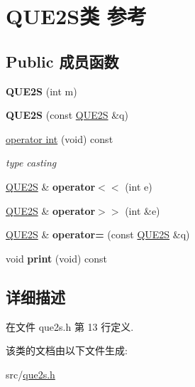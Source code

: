 \hypertarget{classQUE2S}{}\section{Q\+U\+E2\+S类 参考}
\label{classQUE2S}
\subsection*{Public 成员函数}
\begin{DoxyCompactItemize}
\item 
{\bfseries Q\+U\+E2S} (int m)\hypertarget{classQUE2S_a1c32e8ef08e7c8ea6249a6318dcae8c0}{}\label{classQUE2S_a1c32e8ef08e7c8ea6249a6318dcae8c0}

\item 
{\bfseries Q\+U\+E2S} (const \hyperlink{classQUE2S}{Q\+U\+E2S} \&q)\hypertarget{classQUE2S_aa4bdcad6821d11425491e60118fe85f1}{}\label{classQUE2S_aa4bdcad6821d11425491e60118fe85f1}

\item 
\hyperlink{classQUE2S_a8baa6f65d5fccfa902ae6f8b66ed84f5}{operator int} (void) const \hypertarget{classQUE2S_a8baa6f65d5fccfa902ae6f8b66ed84f5}{}\label{classQUE2S_a8baa6f65d5fccfa902ae6f8b66ed84f5}

\begin{DoxyCompactList}\small\item\em type casting \end{DoxyCompactList}\item 
\hyperlink{classQUE2S}{Q\+U\+E2S} \& {\bfseries operator$<$$<$} (int e)\hypertarget{classQUE2S_a49358209d2bcc7f85e74b6323c49e983}{}\label{classQUE2S_a49358209d2bcc7f85e74b6323c49e983}

\item 
\hyperlink{classQUE2S}{Q\+U\+E2S} \& {\bfseries operator$>$$>$} (int \&e)\hypertarget{classQUE2S_a8a7bc53ccf3e2cdd5416caff5feb5d22}{}\label{classQUE2S_a8a7bc53ccf3e2cdd5416caff5feb5d22}

\item 
\hyperlink{classQUE2S}{Q\+U\+E2S} \& {\bfseries operator=} (const \hyperlink{classQUE2S}{Q\+U\+E2S} \&q)\hypertarget{classQUE2S_abd2b18e0cc36cccf4110f129e9e4f8ed}{}\label{classQUE2S_abd2b18e0cc36cccf4110f129e9e4f8ed}

\item 
void {\bfseries print} (void) const \hypertarget{classQUE2S_ae1fa70c73674f87610db5f7c29dc671e}{}\label{classQUE2S_ae1fa70c73674f87610db5f7c29dc671e}

\end{DoxyCompactItemize}


\subsection{详细描述}


在文件 que2s.\+h 第 13 行定义.



该类的文档由以下文件生成\+:\begin{DoxyCompactItemize}
\item 
src/\hyperlink{que2s_8h}{que2s.\+h}\end{DoxyCompactItemize}
